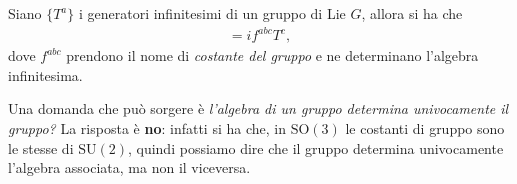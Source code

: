 \begin{definition}
    Siano $\{ T^a \}$ i generatori infinitesimi di un gruppo di Lie $G$, allora si ha che
    \begin{align}
        [T^a, T^b] = i f^{abc} T^c,
    \end{align}
    dove $f^{abc}$ prendono il nome di \emph{costante del gruppo} e ne determinano l'algebra infinitesima.
\end{definition}

Una domanda che può sorgere è \emph{l'algebra di un gruppo determina univocamente il gruppo?} La risposta è \textbf{no}: infatti si ha che, in $\text{SO}(3)$ le costanti di gruppo sono le stesse di
$\text{SU}(2)$, quindi possiamo dire che il gruppo determina univocamente l'algebra associata, ma non il viceversa. 

